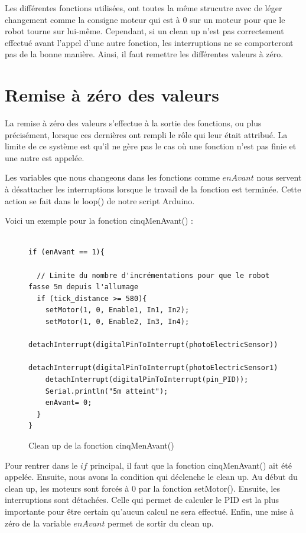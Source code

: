 \documentclass[
	a4paper,									%
	11pt,										%
	twoside,									%
	openright,									%
	notitlepage,									%
	parskip=half,								%
]{scrreprt}										%
\begin{document}
Les différentes fonctions utilisées, ont toutes la même strucutre avec de léger changement comme la consigne moteur qui
est à 0 sur un moteur pour que le robot tourne sur lui-même. Cependant, si un clean up n'est pas correctement effectué 
avant l'appel d'une autre fonction, les interruptions ne se comporteront pas de la bonne manière. Ainsi, il 
faut remettre les différentes valeurs à zéro. 

\section{Remise à zéro des valeurs}

La remise à zéro des valeurs s'effectue à la sortie des fonctions, ou plus précisément, lorsque ces dernières 
ont rempli le rôle qui leur était attribué. La limite de ce système est qu'il ne gère pas le cas où 
une fonction n'est pas finie et une autre est appelée. \par

Les variables que nous changeons dans les fonctions comme $enAvant$ nous servent à désattacher les interruptions
lorsque le travail de la fonction est terminée. Cette action se fait dans le loop() de notre script Arduino. \par

\noindent Voici un exemple pour la fonction cinqMenAvant() : 
\newpage
\begin{figure}[!ht]
	
	\begin{verbatim}

if (enAvant == 1){
  
  // Limite du nombre d'incrémentations pour que le robot fasse 5m depuis l'allumage
  if (tick_distance >= 580){
	setMotor(1, 0, Enable1, In1, In2);
	setMotor(1, 0, Enable2, In3, In4);
	detachInterrupt(digitalPinToInterrupt(photoElectricSensor));
	detachInterrupt(digitalPinToInterrupt(photoElectricSensor1));
	detachInterrupt(digitalPinToInterrupt(pin_PID));
	Serial.println("5m atteint");
	enAvant= 0;
  }
}
	\end{verbatim}
	\caption{Clean up de la fonction cinqMenAvant()}
	\label{remise0}
	\end{figure}

 Pour rentrer dans le $if$ principal, il faut que la fonction cinqMenAvant() ait été appelée. Ensuite, nous avons
 la condition qui déclenche le clean up. Au début du clean up, les moteurs sont forcés à 0 par la fonction setMotor(). 
 Ensuite, les interruptions sont détachées. Celle qui permet de calculer le PID est la plus importante pour 
 être certain qu'aucun calcul ne sera effectué. Enfin, une mise à zéro de la variable $enAvant$ permet de sortir 
 du clean up. 
\end{document}
